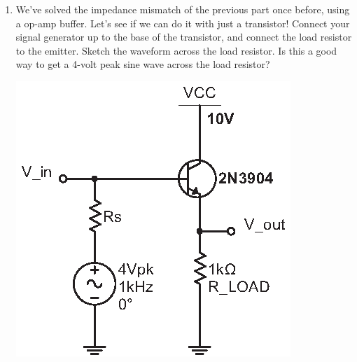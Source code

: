 \begin{enumerate}[wide]
\pagebreak[4]
\item We've solved the impedance mismatch of the previous part once before, using a op-amp buffer.  Let's see if we can do it with just a transistor!  Connect your signal generator up to the base of the transistor, and connect the load resistor to the emitter.  Sketch the waveform across the load resistor.  Is this a good way to get a 4-volt peak sine wave across the load resistor?
\begin{center}
\vspace{-0.08in}
\includegraphics{bjt/ac_with_emit_follower.eps}
\vspace{-0.08in}
\end{center}


\end{enumerate}
